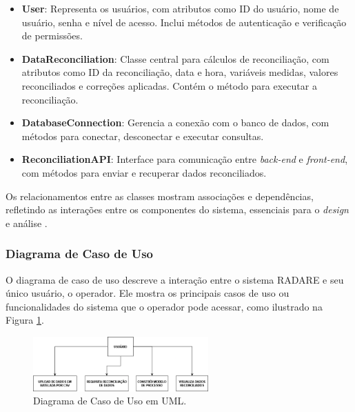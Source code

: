 \begin{itemize}
    \item \textbf{User}: Representa os usuários, com atributos como ID do usuário, nome de usuário, senha e nível de acesso. Inclui métodos de autenticação e verificação de permissões.
    
    \item \textbf{DataReconciliation}: Classe central para cálculos de reconciliação, com atributos como ID da reconciliação, data e hora, variáveis medidas, valores reconciliados e correções aplicadas. Contém o método para executar a reconciliação.
    
    \item \textbf{DatabaseConnection}: Gerencia a conexão com o banco de dados, com métodos para conectar, desconectar e executar consultas.
    
    \item \textbf{ReconciliationAPI}: Interface para comunicação entre \textit{back-end} e \textit{front-end}, com métodos para enviar e recuperar dados reconciliados.
\end{itemize}

Os relacionamentos entre as classes mostram associações e dependências, refletindo as interações entre os componentes do sistema, essenciais para o \textit{design} e análise \cite{softwareenguml}.

\subsubsection{Diagrama de Caso de Uso}

O diagrama de caso de uso descreve a interação entre o sistema RADARE e seu único usuário, o operador. Ele mostra os principais casos de uso ou funcionalidades do sistema que o operador pode acessar, como ilustrado na Figura \ref{fig:UseCaseDiagram}.

\begin{figure}[htb]
    \caption{\label{fig:UseCaseDiagram}Diagrama de Caso de Uso em UML.}
    \begin{center}
        \includegraphics[width=0.6\textwidth]{figuras/DiagramaCasodeUso.drawio.png}
    \end{center}
\end{figure}

